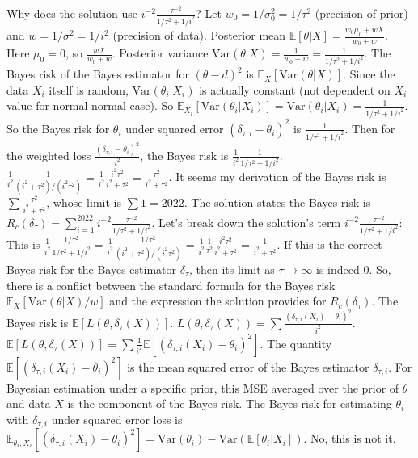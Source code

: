 \begin{enumerate}
Why does the solution use $i^{-2} \frac{\tau^{-2}}{1/\tau^2+1/i^2}$?
Let $w_0 = 1/\sigma_0^2 = 1/\tau^2$ (precision of prior) and $w = 1/\sigma^2 = 1/i^2$ (precision of data).
Posterior mean $\mathbb{E}[\theta|X] = \frac{w_0 \mu_0 + w X}{w_0+w}$. Here $\mu_0=0$, so $\frac{wX}{w_0+w}$.
Posterior variance $\text{Var}(\theta|X) = \frac{1}{w_0+w} = \frac{1}{1/\tau^2 + 1/i^2}$.
The Bayes risk of the Bayes estimator for $(\theta-d)^2$ is $\mathbb{E}_X[\text{Var}(\theta|X)]$.
Since the data $X_i$ itself is random, $\text{Var}(\theta_i|X_i)$ is actually constant (not dependent on $X_i$ value for normal-normal case). So $\mathbb{E}_{X_i}[\text{Var}(\theta_i|X_i)] = \text{Var}(\theta_i|X_i) = \frac{1}{1/\tau^2+1/i^2}$.
So the Bayes risk for $\theta_i$ under squared error $(\delta_{\tau,i}-\theta_i)^2$ is $\frac{1}{1/\tau^2+1/i^2}$.
Then for the weighted loss $\frac{(\delta_{\tau,i}-\theta_i)^2}{i^2}$, the Bayes risk is $\frac{1}{i^2} \frac{1}{1/\tau^2+1/i^2}$.
$\frac{1}{i^2} \frac{1}{(i^2+\tau^2)/(i^2\tau^2)} = \frac{1}{i^2} \frac{i^2\tau^2}{i^2+\tau^2} = \frac{\tau^2}{i^2+\tau^2}$.
It seems my derivation of the Bayes risk is $\sum \frac{\tau^2}{i^2+\tau^2}$, whose limit is $\sum 1 = 2022$.
The solution states the Bayes risk is $R_c(\delta_\tau) = \sum_{i=1}^{2022} i^{-2} \frac{\tau^{-2}}{1/\tau^2+1/i^2}$.
Let's break down the solution's term $i^{-2} \frac{\tau^{-2}}{1/\tau^2+1/i^2}$:
This is $\frac{1}{i^2} \frac{1/\tau^2}{1/\tau^2 + 1/i^2} = \frac{1}{i^2} \frac{1/\tau^2}{(i^2+\tau^2)/(i^2\tau^2)} = \frac{1}{i^2} \frac{1}{\tau^2} \frac{i^2\tau^2}{i^2+\tau^2} = \frac{1}{i^2+\tau^2}$.
If this is the correct Bayes risk for the Bayes estimator $\delta_\tau$, then its limit as $\tau \to \infty$ is indeed $0$.
So, there is a conflict between the standard formula for the Bayes risk $\mathbb{E}_X[\text{Var}(\theta|X)/w]$ and the expression the solution provides for $R_c(\delta_\tau)$.
The Bayes risk is $\mathbb{E}[L(\theta, \delta_\tau(X))]$.
$L(\theta, \delta_\tau(X)) = \sum \frac{(\delta_{\tau,i}(X_i) - \theta_i)^2}{i^2}$.
$\mathbb{E}[L(\theta, \delta_\tau(X))] = \sum \frac{1}{i^2} \mathbb{E}[(\delta_{\tau,i}(X_i) - \theta_i)^2]$.
The quantity $\mathbb{E}[(\delta_{\tau,i}(X_i) - \theta_i)^2]$ is the mean squared error of the Bayes estimator $\delta_{\tau,i}$. For Bayesian estimation under a specific prior, this MSE averaged over the prior of $\theta$ and data $X$ is the component of the Bayes risk.
The Bayes risk for estimating $\theta_i$ with $\delta_{\tau,i}$ under squared error loss is $\mathbb{E}_{\theta_i, X_i}[(\delta_{\tau,i}(X_i)-\theta_i)^2] = \text{Var}(\theta_i) - \text{Var}(\mathbb{E}[\theta_i|X_i])$. No, this is not it.

\end{enumerate}
